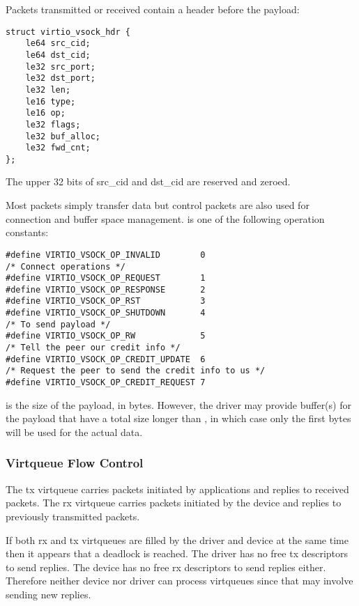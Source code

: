 Packets transmitted or received contain a header before the payload:

\begin{lstlisting}
struct virtio_vsock_hdr {
	le64 src_cid;
	le64 dst_cid;
	le32 src_port;
	le32 dst_port;
	le32 len;
	le16 type;
	le16 op;
	le32 flags;
	le32 buf_alloc;
	le32 fwd_cnt;
};
\end{lstlisting}

The upper 32 bits of src_cid and dst_cid are reserved and zeroed.

Most packets simply transfer data but control packets are also used for
connection and buffer space management.   is one of the following
operation constants:

\begin{lstlisting}
#define VIRTIO_VSOCK_OP_INVALID        0
/* Connect operations */
#define VIRTIO_VSOCK_OP_REQUEST        1
#define VIRTIO_VSOCK_OP_RESPONSE       2
#define VIRTIO_VSOCK_OP_RST            3
#define VIRTIO_VSOCK_OP_SHUTDOWN       4
/* To send payload */
#define VIRTIO_VSOCK_OP_RW             5
/* Tell the peer our credit info */
#define VIRTIO_VSOCK_OP_CREDIT_UPDATE  6
/* Request the peer to send the credit info to us */
#define VIRTIO_VSOCK_OP_CREDIT_REQUEST 7
\end{lstlisting}

 is the size of the payload, in bytes. However, the driver may
provide buffer(s) for the payload that have a total size longer than
, in which case only the first  bytes will be used for
the actual data.

\subsubsection{Virtqueue Flow Control}\label{sec:Device Types / Socket Device / Device Operation / Virtqueue Flow Control}

The tx virtqueue carries packets initiated by applications and replies to
received packets.  The rx virtqueue carries packets initiated by the device and
replies to previously transmitted packets.

If both rx and tx virtqueues are filled by the driver and device at the same
time then it appears that a deadlock is reached.  The driver has no free tx
descriptors to send replies.  The device has no free rx descriptors to send
replies either.  Therefore neither device nor driver can process virtqueues
since that may involve sending new replies.

